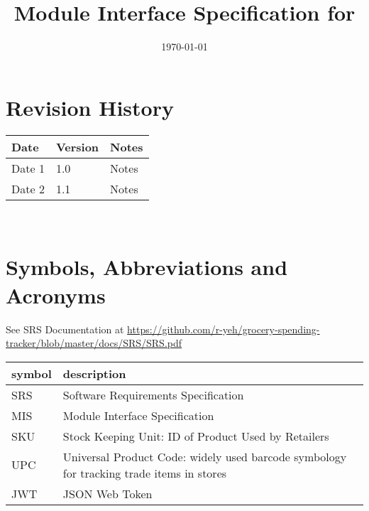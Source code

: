 \documentclass[12pt, titlepage]{article}
\begin{document}
\title{Module Interface Specification for \progname{}}

\author{\authname}

\date{\today}

\maketitle


\section{Revision History}

\begin{tabularx}{\textwidth}{p{3cm}p{2cm}X}
\toprule {\bf Date} & {\bf Version} & {\bf Notes}\\
\midrule
Date 1 & 1.0 & Notes\\
Date 2 & 1.1 & Notes\\
\bottomrule
\end{tabularx}

~\newpage

\section{Symbols, Abbreviations and Acronyms}

See SRS Documentation at \url{https://github.com/r-yeh/grocery-spending-tracker/blob/master/docs/SRS/SRS.pdf}
\newline
\renewcommand{\arraystretch}{1.2}
\begin{tabular}{l l} 
  \toprule		
  \textbf{symbol} & \textbf{description}\\
  \midrule 
  SRS & Software Requirements Specification\\
  MIS & Module Interface Specification \\
  SKU & Stock Keeping Unit: ID of Product Used by Retailers \\
  UPC & Universal Product Code: widely used barcode symbology for tracking trade items in stores \\
  JWT & JSON Web Token \\
  \bottomrule
\end{tabular}\\

\newpage

\tableofcontents

\newpage

\end{document}
